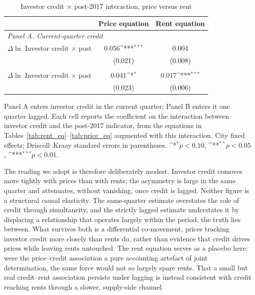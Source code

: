 \documentclass[preprint,11pt,authoryear]{elsarticle}
\newcommand{\sym}[1]{\ifmmode^{#1}\else\(^{#1}\)\fi}
\begin{document}
\begin{table}[t]
\centering
\begin{threeparttable}
\caption{Investor credit $\times$ post-2017 interaction, price versus rent}
\label{tab:divergence}
\begin{tabular}{lcc}
\toprule
 & \multicolumn{1}{c}{Price equation} & \multicolumn{1}{c}{Rent equation} \\
\midrule
\multicolumn{3}{l}{\emph{Panel A. Current-quarter credit}} \\
$\Delta\ln$ Investor credit $\times$ post & 0.056\sym{***} & 0.004 \\
                                          & (0.021) & (0.008) \\
\addlinespace
\multicolumn{3}{l}{\emph{Panel B. One-quarter-lagged credit}} \\
$\Delta\ln$ Investor credit $\times$ post & 0.041\sym{*} & 0.017\sym{***} \\
                                          & (0.023) & (0.006) \\
\bottomrule
\end{tabular}
\begin{tablenotes}[flushleft]\footnotesize
\item Panel A enters investor credit in the current quarter; Panel B enters
it one quarter lagged. Each cell reports the coefficient on the interaction
between investor credit and the post-2017 indicator, from the equations in
Tables~\ref{tab:rent_eq}--\ref{tab:price_eq} augmented with this interaction.
City fixed effects; Driscoll--Kraay standard errors in parentheses.
\sym{*}$p<0.10$, \sym{**}$p<0.05$, \sym{***}$p<0.01$.
\end{tablenotes}
\end{threeparttable}
\end{table}

The reading we adopt is therefore deliberately modest. Investor credit comoves more
tightly with prices than with rents; the asymmetry is large in the same quarter and
attenuates, without vanishing, once credit is lagged. Neither figure is a structural
causal elasticity. The same-quarter estimate overstates the role of credit through
simultaneity, and the strictly lagged estimate understates it by displacing a
relationship that operates largely within the period; the truth lies between. What
survives both is a differential co-movement, prices tracking investor credit more
closely than rents do, rather than evidence that credit drives prices while leaving
rents untouched. The rent equation serves as a placebo here: were the price--credit
association a pure accounting artefact of joint determination, the same force would
not so largely spare rents. That a small but real credit--rent association persists
under lagging is instead consistent with credit reaching rents through a slower,
supply-side channel.
\end{document}
